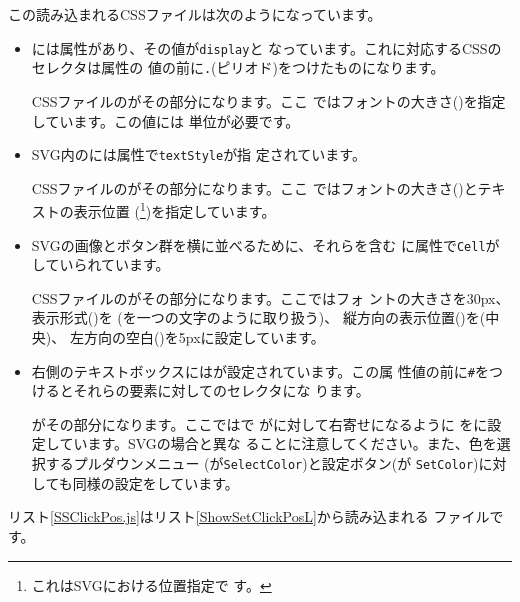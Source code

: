 この読み込まれるCSSファイルは次のようになっています。
\begin{itemize}
 \item {}には属性があり、その値が\texttt{display}と
       なっています。これに対応するCSSのセレクタは属性の
       値の前に\texttt{.}(ピリオド)をつけたものになります。

       CSSファイルのがその部分になります。ここ
       ではフォントの大きさ()を指定しています。この値には
       単位が必要です。
 \item SVG内のには属性で\texttt{textStyle}が指
       定されています。

       CSSファイルのがその部分になります。ここ
       ではフォントの大きさ()とテキストの表示位置
       (\footnote{これはSVGにおける位置指定で
       す。})を指定しています。
 \item SVGの画像とボタン群を横に並べるために、それらを含む
       に属性で\texttt{Cell}がしていられています。

       CSSファイルのがその部分になります。ここではフォ
       ントの大きさを30px、表示形式()を
       (を一つの文字のように取り扱う)、
       縦方向の表示位置()を(中央)、
       左方向の空白()を5pxに設定しています。
 \item 右側のテキストボックスにはが設定されています。この属
       性値の前に\texttt{\#}をつけるとそれらの要素に対してのセレクタにな
       ります。

       がその部分になります。ここではで
       がに対して右寄せになるように
       をに設定しています。SVGの場合と異な
       ることに注意してください。また、色を選択するプルダウンメニュー
       (が\texttt{SelectColor})と設定ボタン(が
       \texttt{SetColor})に対しても同様の設定をしています。
\end{itemize}
リスト\ref{SSClickPos.js}はリスト\ref{ShowSetClickPosL}から読み込まれる
\JS ファイルです。
